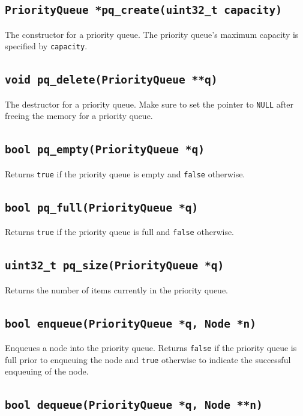 \documentclass[11pt]{article}
\begin{document}
\subsection{\texttt{PriorityQueue *pq\_create(uint32\_t capacity)}}

The constructor for a priority queue. The priority queue's maximum
capacity is specified by \texttt{capacity}.

\subsection{\texttt{void pq\_delete(PriorityQueue **q)}}

The destructor for a priority queue. Make sure to set the pointer to
\texttt{NULL} after freeing the memory for a priority queue.

\subsection{\texttt{bool pq\_empty(PriorityQueue *q)}}

Returns \texttt{true} if the priority queue is empty and \texttt{false}
otherwise.

\subsection{\texttt{bool pq\_full(PriorityQueue *q)}}

Returns \texttt{true} if the priority queue is full and \texttt{false}
otherwise.

\subsection{\texttt{uint32\_t pq\_size(PriorityQueue *q)}}

Returns the number of items currently in the priority queue.

\subsection{\texttt{bool enqueue(PriorityQueue *q, Node *n)}}

Enqueues a node into the priority queue. Returns \texttt{false} if the
priority queue is full prior to enqueuing the node and \texttt{true}
otherwise to indicate the successful enqueuing of the node.

\subsection{\texttt{bool dequeue(PriorityQueue *q, Node **n)}}
\end{document}
